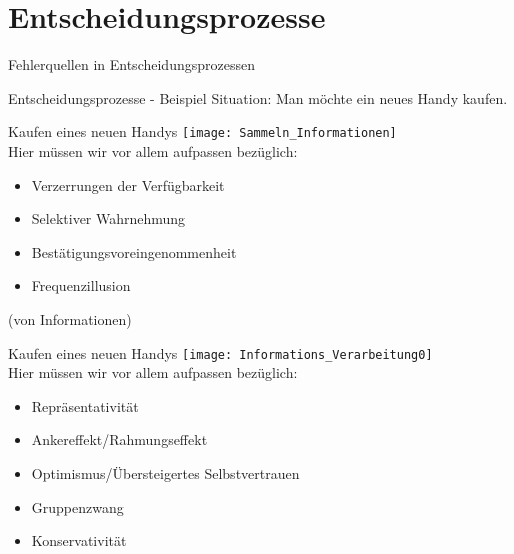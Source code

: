 \section{Entscheidungsprozesse}

\begin{frame}[c]{Fehlerquellen in Entscheidungsprozessen}
    \centering
\end{frame}

\begin{frame}[c]{Entscheidungsprozesse - Beispiel}
    \Large
    Situation: Man möchte ein neues Handy kaufen. \\
\end{frame}


\begin{frame}[c]{Kaufen eines neuen Handys}
    \texttt{[image: Sammeln\_Informationen]} \\
    Hier müssen wir vor allem aufpassen bezüglich:
    \begin{itemize}[<+(1)->]
        \item Verzerrungen der Verfügbarkeit
        \item Selektiver Wahrnehmung
        \item Bestätigungsvoreingenommenheit
        \item Frequenzillusion
    \end{itemize}
    (von Informationen)
\end{frame}


\begin{frame}[c]{Kaufen eines neuen Handys}
    \texttt{[image: Informations\_Verarbeitung0]} \\
    Hier müssen wir vor allem aufpassen bezüglich:
    \begin{itemize}[<+(1)->]
        \item Repräsentativität
        \item Ankereffekt/Rahmungseffekt
        \item Optimismus/Übersteigertes Selbstvertrauen
        \item Gruppenzwang
        \item Konservativität
    \end{itemize}
\end{frame}


